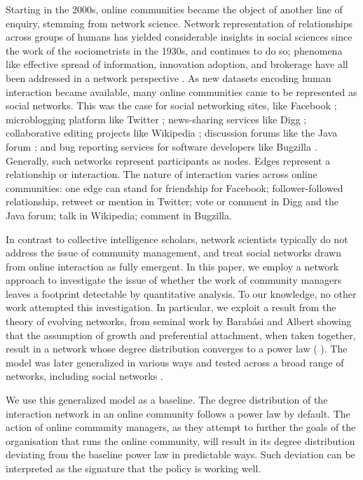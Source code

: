 \documentclass{bmcart}
\begin{document}
Starting in the 2000s, online communities became the object of another line of enquiry, stemming from network science. Network representation of relationships across groups of humans has yielded considerable insights in social sciences since the work of the sociometrists in the 1930s, and continues to do so; phenomena like effective spread of information, innovation adoption, and brokerage have all been addressed in a network perspective \cite{borgatti2009network} \cite{burt2009structural}. As new datasets encoding human interaction became available, many online communities came to be represented as social networks. This was the case for social networking sites, like Facebook \cite{lewis2008tastes} \cite{nick2013toward}; microblogging platform like Twitter \cite{kunegis2013preferential} \cite{java2007we} \cite{hodas2014simple}; news-sharing services like Digg \cite{hodas2014simple}; collaborative editing projects like Wikipedia \cite{laniado2011wikipedians}; discussion forums like the Java forum \cite{zhang2007expertise}; and bug reporting services for software developers like Bugzilla \cite{zanetti2012quantitative}. Generally, such networks represent participants as nodes. Edges represent a relationship or interaction. The nature of interaction varies across online communities: one edge can stand for friendship for Facebook; follower-followed relationship, retweet or mention in Twitter; vote or comment in Digg and the Java forum; talk in Wikipedia; comment in Bugzilla. 

In contrast to collective intelligence scholars, network scientists typically do not address the issue of community management, and treat social networks drawn from online interaction as fully emergent. In this paper, we employ a network approach to investigate the issue of whether the work of community managers leaves a footprint detectable by quantitative analysis. To our knowledge, no other work attempted this investigation.
In particular, we exploit a result from the theory of evolving networks, from seminal work by Barab\'asi and Albert \cite{barabasi1999emergence} showing that the assumption of growth and preferential attachment, when taken together, result in a network whose degree distribution converges to a power law ( \cite{barabasi2005origin} \cite{barabasi1999mean}). The model was later generalized in various ways and tested across a broad range of networks, including social networks 
\cite{dorogovtsev2002evolution}. 

We use this generalized model as a baseline. The degree distribution of the interaction network in an online community follows a power law by default. The action of online community managers, as they attempt to further the goals of the organisation that runs the online community, will result in its degree distribution deviating from the baseline power law in predictable ways. Such deviation can be interpreted as the signature that the policy is working well. 
\end{document}
